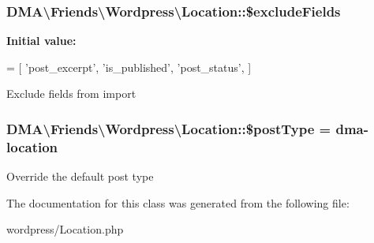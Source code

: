 \subsubsection[{\$exclude\+Fields}]{\setlength{\rightskip}{0pt plus 5cm}D\+M\+A\textbackslash{}\+Friends\textbackslash{}\+Wordpress\textbackslash{}\+Location\+::\$exclude\+Fields\hspace{0.3cm}{\ttfamily [protected]}}\label{classDMA_1_1Friends_1_1Wordpress_1_1Location_ae18a475210d12a42d335d6ca6fb47811}
{\bfseries Initial value\+:}
\begin{DoxyCode}
= [
        \textcolor{stringliteral}{'post\_excerpt'},
        \textcolor{stringliteral}{'is\_published'},
        \textcolor{stringliteral}{'post\_status'},
    ]
\end{DoxyCode}
Exclude fields from import \hypertarget{classDMA_1_1Friends_1_1Wordpress_1_1Location_a40f4ecf15a53d860bfbba3484f2999bf}{}
\subsubsection[{\$post\+Type}]{\setlength{\rightskip}{0pt plus 5cm}D\+M\+A\textbackslash{}\+Friends\textbackslash{}\+Wordpress\textbackslash{}\+Location\+::\$post\+Type = \textquotesingle{}dma-\/location\textquotesingle{}}\label{classDMA_1_1Friends_1_1Wordpress_1_1Location_a40f4ecf15a53d860bfbba3484f2999bf}
Override the default post type 

The documentation for this class was generated from the following file\+:\begin{DoxyCompactItemize}
\item 
wordpress/Location.\+php\end{DoxyCompactItemize}
